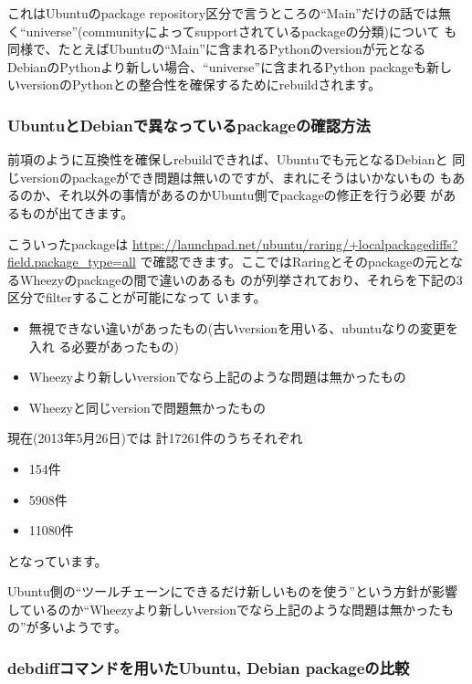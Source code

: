 \documentclass[mingoth,a4paper]{jsarticle}
\begin{document}
これはUbuntuのpackage repository区分で言うところの``Main''だけの話では無
く``universe''(communityによってsupportされているpackageの分類)について
も同様で、たとえばUbuntuの``Main''に含まれるPythonのversionが元となる
DebianのPythonより新しい場合、``universe''に含まれるPython packageも新し
いversionのPythonとの整合性を確保するためにrebuildされます。

\subsubsection{UbuntuとDebianで異なっているpackageの確認方法}

前項のように互換性を確保しrebuildできれば、Ubuntuでも元となるDebianと
同じversionのpackageができ問題は無いのですが、まれにそうはいかないもの
もあるのか、それ以外の事情があるのかUbuntu側でpackageの修正を行う必要
があるものが出てきます。

こういったpackageは
\url{https://launchpad.net/ubuntu/raring/+localpackagediffs?field.package_type=all}
で確認できます。ここではRaringとそのpackageの元となるWheezyのpackageの間で違いのあるも
のが列挙されており、それらを下記の3区分でfilterすることが可能になって
います。

\begin{itemize}
\itemsep1pt\parskip0pt
\item
  無視できない違いがあったもの(古いversionを用いる、ubuntuなりの変更を入れ
  る必要があったもの)
\item
  Wheezyより新しいversionでなら上記のような問題は無かったもの
\item
  Wheezyと同じversionで問題無かったもの
\end{itemize}

現在(2013年5月26日)では 計17261件のうちそれぞれ

\begin{itemize}
\itemsep1pt\parskip0pt
\item
  154件
\item
  5908件
\item
  11080件
\end{itemize}

となっています。

Ubuntu側の``ツールチェーンにできるだけ新しいものを使う''という方針が影響
しているのか``Wheezyより新しいversionでなら上記のような問題は無かったも
の''が多いようです。

\subsubsection{debdiffコマンドを用いたUbuntu, Debian packageの比較}
\end{document}
